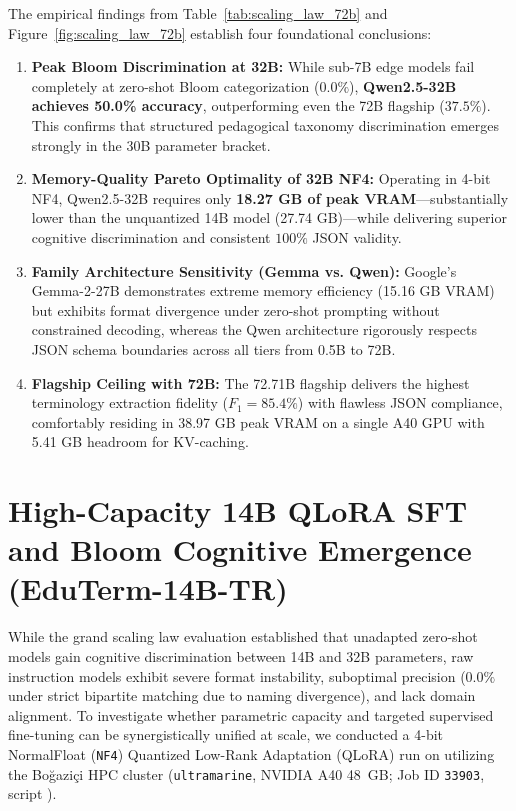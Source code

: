 \documentclass[a4paper,12pt]{report}
\begin{document}
The empirical findings from Table~\ref{tab:scaling_law_72b} and Figure~\ref{fig:scaling_law_72b} establish four foundational conclusions:
\begin{enumerate}
    \item \textbf{Peak Bloom Discrimination at 32B:} While sub-7B edge models fail completely at zero-shot Bloom categorization ($0.0\%$), \textbf{Qwen2.5-32B achieves 50.0\% accuracy}, outperforming even the 72B flagship ($37.5\%$). This confirms that structured pedagogical taxonomy discrimination emerges strongly in the 30B parameter bracket.
    \item \textbf{Memory-Quality Pareto Optimality of 32B NF4:} Operating in 4-bit NF4, Qwen2.5-32B requires only \textbf{18.27 GB of peak VRAM}—substantially lower than the unquantized 14B model (27.74 GB)—while delivering superior cognitive discrimination and consistent $100\%$ JSON validity.
    \item \textbf{Family Architecture Sensitivity (Gemma vs. Qwen):} Google's Gemma-2-27B demonstrates extreme memory efficiency (15.16 GB VRAM) but exhibits format divergence under zero-shot prompting without constrained decoding, whereas the Qwen architecture rigorously respects JSON schema boundaries across all tiers from 0.5B to 72B.
    \item \textbf{Flagship Ceiling with 72B:} The 72.71B flagship delivers the highest terminology extraction fidelity ($F_1 = 85.4\%$) with flawless JSON compliance, comfortably residing in 38.97 GB peak VRAM on a single A40 GPU with 5.41 GB headroom for KV-caching.
\end{enumerate}

\section{High-Capacity 14B QLoRA SFT and Bloom Cognitive Emergence (EduTerm-14B-TR)}
\label{sec:eduterm_14b_sft}

While the grand scaling law evaluation established that unadapted zero-shot models gain cognitive discrimination between 14B and 32B parameters, raw instruction models exhibit severe format instability, suboptimal precision ($0.0\%$ under strict bipartite matching due to naming divergence), and lack domain alignment. To investigate whether parametric capacity and targeted supervised fine-tuning can be synergistically unified at scale, we conducted a 4-bit NormalFloat (\texttt{NF4}) Quantized Low-Rank Adaptation (QLoRA) run on  utilizing the Bo\u{g}azi\c{c}i HPC cluster (\texttt{ultramarine}, NVIDIA A40 48~GB; Job ID \texttt{33903}, script ).
\end{document}
